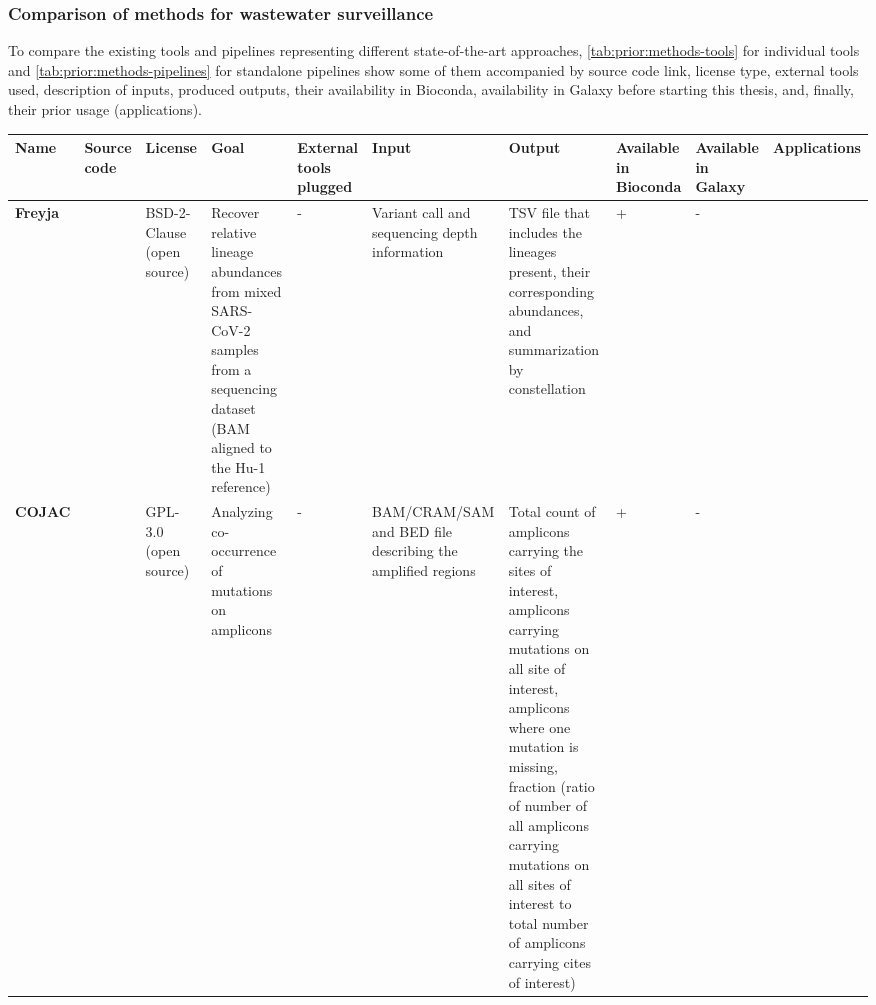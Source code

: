         \subsubsection{Comparison of methods for wastewater surveillance} \label{sec:prior:methods:comparison}
        To compare the existing tools and pipelines representing different state-of-the-art approaches, \cref{tab:prior:methods-tools} for individual tools and \cref{tab:prior:methods-pipelines} for standalone pipelines show some of them accompanied by source code link, license type, external tools used, description of inputs, produced outputs, their availability in Bioconda, availability in Galaxy before starting this thesis, and, finally, their prior usage (applications).
        \begin{landscape}
            \centering\vspace*{\fill}
                \begin{table}[ht!]
                \tiny
                \begin{tabular}{l|l|l|l|l|l|l|l|l|l}
\multicolumn{1}{m{1cm}|}{\textbf{Name}}&\multicolumn{1}{m{1cm}|}{\textbf{Source code}}&\multicolumn{1}{m{1cm}|}{\textbf{License}}&\multicolumn{1}{m{3cm}|}{\textbf{Goal}}&\multicolumn{1}{m{3cm}|}{\textbf{External tools plugged}}&\multicolumn{1}{m{3cm}|}{\textbf{Input}}&\multicolumn{1}{m{3cm}|}{\textbf{Output}}&\multicolumn{1}{m{1cm}|}{\textbf{Available in Bioconda}}&\multicolumn{1}{m{1cm}|}{\textbf{Available in Galaxy}}&\multicolumn{1}{m{1cm}}{\textbf{Applications}}\\ \hline 
\multicolumn{1}{m{1cm}|}{\textbf{Freyja}}&\multicolumn{1}{m{1cm}|}{\cite{joshuailevy2022}}&\multicolumn{1}{m{1cm}|}{BSD-2-Clause (open source)}&\multicolumn{1}{m{3cm}|}{Recover relative lineage abundances from mixed SARS-CoV-2 samples from a sequencing dataset (BAM aligned to the Hu-1 reference)}&\multicolumn{1}{m{3cm}|}{-}&\multicolumn{1}{m{3cm}|}{Variant call and sequencing depth information}&\multicolumn{1}{m{3cm}|}{TSV file that includes the lineages present, their corresponding abundances, and summarization by constellation}&\multicolumn{1}{m{1cm}|}{+}&\multicolumn{1}{m{1cm}|}{-}&\multicolumn{1}{m{1cm}}{\cite{karthikeyan2022,solismoreira2022,nutrition2022,karthikeyan2022b}}\\ \hline 
\multicolumn{1}{m{1cm}|}{\textbf{COJAC}}&\multicolumn{1}{m{1cm}|}{\cite{cojac2022}}&\multicolumn{1}{m{1cm}|}{GPL-3.0 (open source)}&\multicolumn{1}{m{3cm}|}{Analyzing co-occurrence of mutations on amplicons}&\multicolumn{1}{m{3cm}|}{-}&\multicolumn{1}{m{3cm}|}{BAM/CRAM/SAM and BED file describing the amplified regions}&\multicolumn{1}{m{3cm}|}{Total count of amplicons carrying the sites of interest, amplicons carrying mutations on all site of interest, amplicons where one mutation is missing, fraction (ratio of number of all amplicons carrying mutations on all sites of interest to total number of amplicons carrying cites of interest) }&\multicolumn{1}{m{1cm}|}{+}&\multicolumn{1}{m{1cm}|}{-}&\multicolumn{1}{m{1cm}}{\cite{jahn2022,karthikeyan2022b,jbc}}\\ \hline 

\end{tabular}
\end{table}
\end{landscape}
